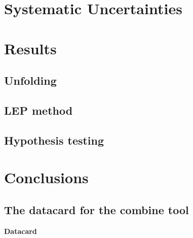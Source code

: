 \documentclass[titlepage, a4paper, EN, FULL]{mythesis}
\renewcommand{\normalsize}{\fontsize{12pt}{13.4pt}\selectfont}
\begin{document}
\chapter{Systematic Uncertainties}
\label{chap:systematic_uncertainties}


\chapter{Results}
\label{chap:results}


\clearpage
\section{Unfolding}


\clearpage
\section{LEP method}


\clearpage
\section{Hypothesis testing}


\chapter{Conclusions}


\appendix
{
      \begin{landscape}
        \chapter{The datacard for the combine tool}
        \label{a:datacard}
        \textbf{Datacard}\\
        \footnotesize
        
        \normalsize
      \end{landscape}
      
}
\clearpage
\printbibliography[heading=bibintoc]
\end{document}
